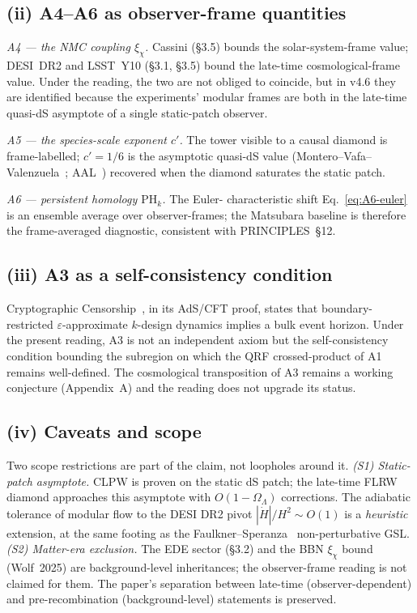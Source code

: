 \subsection*{(ii) A4--A6 as observer-frame quantities}

\emph{A4 --- the NMC coupling $\xi_\chi$.} Cassini (\S3.5) bounds the
solar-system-frame value; DESI~DR2 and LSST~Y10 (\S3.1, \S3.5) bound
the late-time cosmological-frame value. Under the reading, the two
are not obliged to coincide, but in v4.6 they are identified because
the experiments' modular frames are both in the late-time quasi-dS
asymptote of a single static-patch observer.

\emph{A5 --- the species-scale exponent $c'$.} The tower visible to a
causal diamond is frame-labelled; $c' = 1/6$ is the asymptotic
quasi-dS value (Montero--Vafa--Valenzuela~\cite{Montero2022};
AAL~\cite{AAL2023}) recovered when the diamond saturates the static
patch.

\emph{A6 --- persistent homology $\mathrm{PH}_k$.} The Euler-
characteristic shift Eq.~\eqref{eq:A6-euler} is an ensemble average
over observer-frames; the Matsubara baseline is therefore the
frame-averaged diagnostic, consistent with PRINCIPLES~\S12.

\subsection*{(iii) A3 as a self-consistency condition}

Cryptographic Censorship~\cite{CryptoCensorship}, in its AdS/CFT
proof, states that boundary-restricted $\varepsilon$-approximate
$k$-design dynamics implies a bulk event horizon. Under the present
reading, A3 is not an independent axiom but the self-consistency
condition bounding the subregion on which the QRF crossed-product
of A1 remains well-defined.
The cosmological transposition of A3 remains a working conjecture
(Appendix~A) and the reading does not upgrade its status.

\subsection*{(iv) Caveats and scope}

Two scope restrictions are part of the claim, not loopholes around it.
\emph{(S1) Static-patch asymptote.} CLPW is proven on the static dS
patch; the late-time FLRW diamond approaches this asymptote with
$O(1-\Omega_\Lambda)$ corrections. The adiabatic tolerance of modular
flow to the DESI DR2 pivot $|\dot H|/H^2 \sim O(1)$ is a
\emph{heuristic} extension, at the same footing as the
Faulkner--Speranza~\cite{FaulknerSperanza2024} non-perturbative GSL.
\emph{(S2) Matter-era exclusion.} The EDE sector (\S3.2) and the BBN
$\xi_\chi$ bound (Wolf~2025) are background-level inheritances; the
observer-frame reading is not claimed for them. The paper's
separation between late-time (observer-dependent) and
pre-recombination (background-level) statements is preserved.


